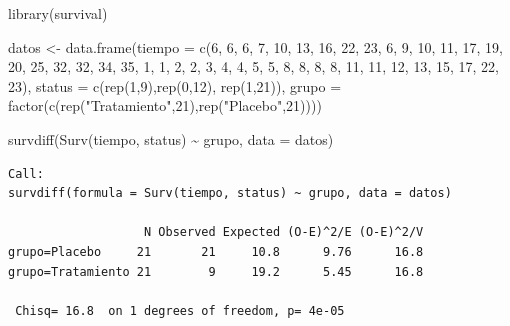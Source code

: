 \documentclass[
]{article}
\newenvironment{Shaded}{\begin{snugshade}}{\end{snugshade}}
\newcommand{\AttributeTok}[1]{\textcolor[rgb]{0.40,0.45,0.13}{#1}}
\newcommand{\DecValTok}[1]{\textcolor[rgb]{0.68,0.00,0.00}{#1}}
\newcommand{\FunctionTok}[1]{\textcolor[rgb]{0.28,0.35,0.67}{#1}}
\newcommand{\NormalTok}[1]{\textcolor[rgb]{0.00,0.23,0.31}{#1}}
\newcommand{\OtherTok}[1]{\textcolor[rgb]{0.00,0.23,0.31}{#1}}
\newcommand{\SpecialCharTok}[1]{\textcolor[rgb]{0.37,0.37,0.37}{#1}}
\newcommand{\StringTok}[1]{\textcolor[rgb]{0.13,0.47,0.30}{#1}}
\begin{document}
\begin{Shaded}
\begin{Highlighting}[]
\FunctionTok{library}\NormalTok{(survival)}

\NormalTok{datos }\OtherTok{\textless{}{-}} \FunctionTok{data.frame}\NormalTok{(}\AttributeTok{tiempo =} \FunctionTok{c}\NormalTok{(}\DecValTok{6}\NormalTok{, }\DecValTok{6}\NormalTok{, }\DecValTok{6}\NormalTok{, }\DecValTok{7}\NormalTok{, }\DecValTok{10}\NormalTok{, }\DecValTok{13}\NormalTok{, }\DecValTok{16}\NormalTok{, }\DecValTok{22}\NormalTok{, }\DecValTok{23}\NormalTok{, }
                               \DecValTok{6}\NormalTok{, }\DecValTok{9}\NormalTok{, }\DecValTok{10}\NormalTok{, }\DecValTok{11}\NormalTok{, }\DecValTok{17}\NormalTok{, }\DecValTok{19}\NormalTok{, }\DecValTok{20}\NormalTok{, }\DecValTok{25}\NormalTok{, }\DecValTok{32}\NormalTok{, }\DecValTok{32}\NormalTok{, }\DecValTok{34}\NormalTok{, }\DecValTok{35}\NormalTok{, }
                               \DecValTok{1}\NormalTok{, }\DecValTok{1}\NormalTok{, }\DecValTok{2}\NormalTok{, }\DecValTok{2}\NormalTok{, }\DecValTok{3}\NormalTok{, }\DecValTok{4}\NormalTok{, }\DecValTok{4}\NormalTok{, }\DecValTok{5}\NormalTok{, }\DecValTok{5}\NormalTok{, }\DecValTok{8}\NormalTok{, }\DecValTok{8}\NormalTok{, }\DecValTok{8}\NormalTok{, }\DecValTok{8}\NormalTok{, }\DecValTok{11}\NormalTok{, }
                               \DecValTok{11}\NormalTok{, }\DecValTok{12}\NormalTok{, }\DecValTok{13}\NormalTok{, }\DecValTok{15}\NormalTok{, }\DecValTok{17}\NormalTok{, }\DecValTok{22}\NormalTok{, }\DecValTok{23}\NormalTok{),}
                    \AttributeTok{status =} \FunctionTok{c}\NormalTok{(}\FunctionTok{rep}\NormalTok{(}\DecValTok{1}\NormalTok{,}\DecValTok{9}\NormalTok{),}\FunctionTok{rep}\NormalTok{(}\DecValTok{0}\NormalTok{,}\DecValTok{12}\NormalTok{), }\FunctionTok{rep}\NormalTok{(}\DecValTok{1}\NormalTok{,}\DecValTok{21}\NormalTok{)),}
                    \AttributeTok{grupo =} \FunctionTok{factor}\NormalTok{(}\FunctionTok{c}\NormalTok{(}\FunctionTok{rep}\NormalTok{(}\StringTok{"Tratamiento"}\NormalTok{,}\DecValTok{21}\NormalTok{),}\FunctionTok{rep}\NormalTok{(}\StringTok{"Placebo"}\NormalTok{,}\DecValTok{21}\NormalTok{))))}

\FunctionTok{survdiff}\NormalTok{(}\FunctionTok{Surv}\NormalTok{(tiempo, status) }\SpecialCharTok{\textasciitilde{}}\NormalTok{ grupo, }\AttributeTok{data =}\NormalTok{ datos)}
\end{Highlighting}
\end{Shaded}

\begin{verbatim}
Call:
survdiff(formula = Surv(tiempo, status) ~ grupo, data = datos)

                   N Observed Expected (O-E)^2/E (O-E)^2/V
grupo=Placebo     21       21     10.8      9.76      16.8
grupo=Tratamiento 21        9     19.2      5.45      16.8

 Chisq= 16.8  on 1 degrees of freedom, p= 4e-05 
\end{verbatim}
\end{document}
